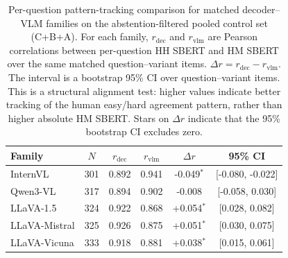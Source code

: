\begin{table}[t]
\centering
\small
\setlength{\tabcolsep}{3pt}

\caption{Per-question pattern-tracking comparison for matched decoder--VLM families on the abstention-filtered pooled control set (C+B+A). For each family, $r_{\mathrm{dec}}$ and $r_{\mathrm{vlm}}$ are Pearson correlations between per-question HH SBERT and HM SBERT over the same matched question--variant items. $\Delta r = r_{\mathrm{dec}} - r_{\mathrm{vlm}}$. The interval is a bootstrap 95\% CI over question--variant items. This is a structural alignment test: higher values indicate better tracking of the human easy/hard agreement pattern, rather than higher absolute HM SBERT. Stars on $\Delta r$ indicate that the 95\% bootstrap CI excludes zero.}
\label{tab:matched_family_pattern_tracking}
\begin{tabular}{lccccc}
\toprule
\textbf{Family} & \textbf{$N$} & \textbf{$r_{\mathrm{dec}}$} & \textbf{$r_{\mathrm{vlm}}$} & \textbf{$\Delta r$} & \textbf{95\% CI} \\
\midrule
InternVL & 301 & 0.892 & 0.941 & -0.049$^{*}$ & [-0.080, -0.022] \\
Qwen3-VL & 317 & 0.894 & 0.902 & -0.008 & [-0.058, 0.030] \\
LLaVA-1.5 & 324 & 0.922 & 0.868 & +0.054$^{*}$ & [0.028, 0.082] \\
LLaVA-Mistral & 325 & 0.926 & 0.875 & +0.051$^{*}$ & [0.030, 0.075] \\
LLaVA-Vicuna & 333 & 0.918 & 0.881 & +0.038$^{*}$ & [0.015, 0.061] \\
\bottomrule
\end{tabular}
\end{table}
